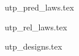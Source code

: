 \documentclass[11pt,a4paper]{article}
\begin{document}
% 




\newpage



\newpage



\newpage

 {utp_pred_laws.tex}

\newpage

 {utp_rel_laws.tex}

\newpage

 {utp_designs.tex}


% 

%
%
\end{document}
